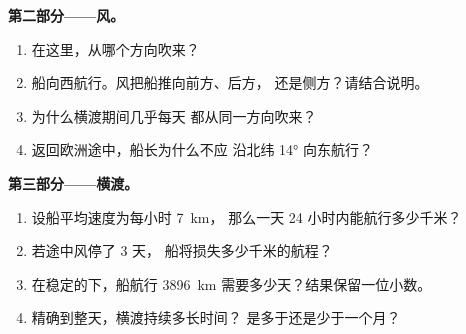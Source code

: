 \begin{problem}
\noindent\textbf{第二部分——风。}\par\nopagebreak
\begin{enumerate}[resume, beginpenalty=10000]
  \item 在这里，从哪个方向吹来？
  \item 船向西航行。风把船推向前方、后方，
        还是侧方？请结合说明。
  \item 为什么横渡期间几乎每天
        都从同一方向吹来？
  \item 返回欧洲途中，船长为什么不应
        沿北纬 \ang{14} 向东航行？
\end{enumerate}

\noindent\textbf{第三部分——横渡。}\par\nopagebreak
\begin{enumerate}[resume, beginpenalty=10000]
  \item 设船平均速度为每小时 \qty{7}{km}，
        那么一天 24 小时内能航行多少千米？
  \item 若途中风停了 3 天，
        船将损失多少千米的航程？
  \item 在稳定的下，船航行
        \qty{3896}{km} 需要多少天？结果保留一位小数。
  \item 精确到整天，横渡持续多长时间？
        是多于还是少于一个月？
\end{enumerate}
\end{problem}
